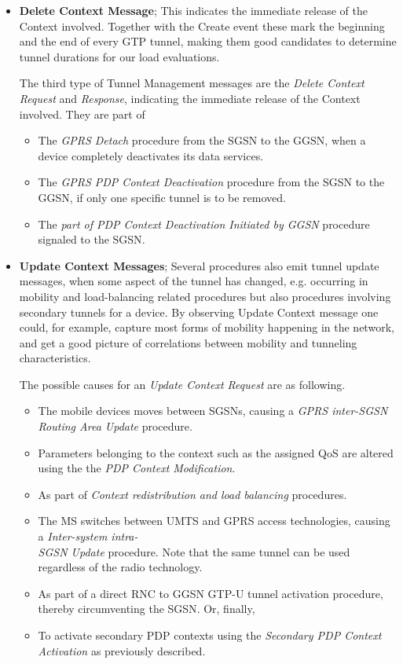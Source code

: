 \begin{itemize}
\item \textbf{Delete Context Message}; This indicates the immediate release of the Context involved. 
Together with the Create event these mark the beginning and the end of every GTP tunnel, making them good candidates to determine tunnel durations for our load evaluations.

The third type of Tunnel Management messages are the \textit{Delete Context Request} and \textit{Response}, indicating the immediate release of the Context involved. They are part of 

\begin{itemize}
	\item The \textit{GPRS Detach} procedure from the \gls{SGSN} to the \gls{GGSN}, when a device completely deactivates its data services.
	\item The \textit{GPRS PDP Context Deactivation} procedure from the \gls{SGSN} to the \gls{GGSN}, if only one specific tunnel is to be removed.
	\item The \textit{part of PDP Context Deactivation Initiated by GGSN} procedure signaled to the \gls{SGSN}.
\end{itemize}


\item \textbf{Update Context Messages}; Several procedures also emit tunnel update messages, when some aspect of the tunnel has changed, e.g. occurring in mobility and load-balancing related procedures but also procedures involving secondary tunnels for a device.
By observing Update Context message one could, for example, capture most forms of mobility happening in the network, and get a good picture of correlations between mobility and tunneling characteristics. 

The possible causes for an \textit{Update Context Request} are as following.

\begin{itemize}
	\item The mobile devices moves between \glspl{SGSN}, causing a \textit{GPRS inter-SGSN Routing Area Update} procedure.
	\item Parameters belonging to the context such as the assigned \gls{QoS} are altered using the the \textit{PDP Context Modification}.
	\item As part of \textit{Context redistribution and load balancing} procedures.
	\item The \gls{MS} switches between \gls{UMTS} and \gls{GPRS} access technologies, causing a \textit{Inter-system intra- \\SGSN Update} procedure. Note that the same tunnel can be used regardless of the radio technology.
	\item As part of a direct \gls{RNC} to \gls{GGSN} GTP-U tunnel activation procedure, thereby circumventing the \gls{SGSN}. Or, finally, 
	\item To activate secondary PDP contexts using the \textit{Secondary PDP Context Activation} as previously described. 
\end{itemize}


\end{itemize}
